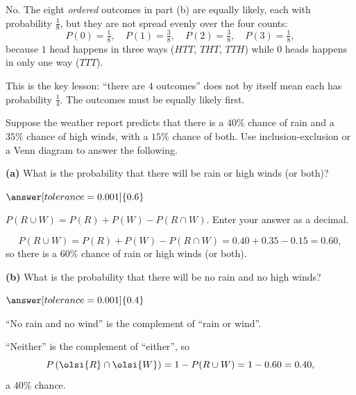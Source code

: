 \documentclass[12pt]{ximera}
\begin{document}
\begin{problem}
\begin{prompt}
\begin{multipleChoice}
\end{multipleChoice}

\begin{feedback}
No. The eight \emph{ordered} outcomes in part (b) are equally likely, each with
probability $\frac18$, but they are not spread evenly over the four counts:
\[
P(0)=\tfrac18,\quad P(1)=\tfrac38,\quad P(2)=\tfrac38,\quad P(3)=\tfrac18,
\]
because $1$ head happens in three ways ($HTT$, $THT$, $TTH$) while $0$ heads happens
in only one way ($TTT$).

This is the key lesson: ``there are $4$ outcomes'' does not by itself mean each has
probability $\frac14$. The outcomes must be equally likely first.
\end{feedback}
\end{prompt}
\end{problem}

\begin{problem}
Suppose the weather report predicts that there is a $40\%$ chance of rain and a
$35\%$ chance of high winds, with a $15\%$ chance of both. Use inclusion-exclusion
or a Venn diagram to answer the following.

\begin{prompt}
\textbf{(a)} What is the probability that there will be rain or high winds (or
both)?

$\answer[tolerance=0.001]{0.6}$

\begin{hint}
$P(R\cup W)=P(R)+P(W)-P(R\cap W)$. Enter your answer as a decimal.
\end{hint}

\begin{feedback}
\[
P(R\cup W)=P(R)+P(W)-P(R\cap W)=0.40+0.35-0.15=0.60,
\]
so there is a $60\%$ chance of rain or high winds (or both).
\end{feedback}
\end{prompt}

\begin{prompt}
\textbf{(b)} What is the probability that there will be no rain and no high winds?

$\answer[tolerance=0.001]{0.4}$

\begin{hint}
``No rain and no wind'' is the complement of ``rain or wind''.
\end{hint}

\begin{feedback}
``Neither'' is the complement of ``either'', so
\[
P\left(\olsi{R}\cap\olsi{W}\right)=1-P(R\cup W)=1-0.60=0.40,
\]
a $40\%$ chance.
\end{feedback}
\end{prompt}
\end{problem}
\end{document}
